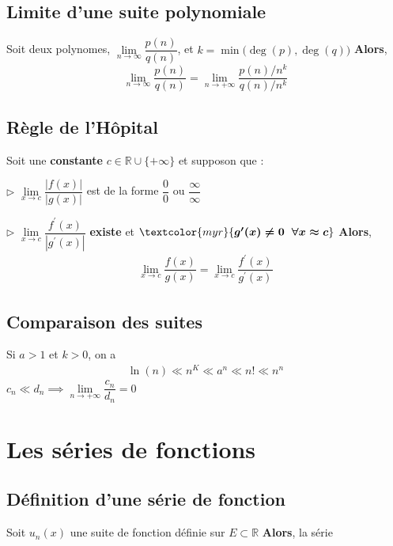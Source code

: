 \documentclass{report}
\begin{document}
\begin{multicols*}{3}
    \section{Limite d'une suite polynomiale} 
        Soit deux polynomes,
        $\lim\limits_{n\to \infty } \dfrac{p(n)}{q(n)}$, 
        et 
        $k = \min\bigl(\deg(p), \deg(q)\bigr)$
        \textbf{Alors},   
        \[ \lim\limits_{n\to \infty } \dfrac{p(n)}{q(n)} =
        \lim\limits_{n\to+\infty}\dfrac{p(n)/{n^k}}{q(n)/n^{k}} \]



    \section{Règle de l'Hôpital}
        Soit une \textbf{constante} $c \in \mathbb{R} \cup \{+\infty\}$ et 
        supposon que : 

        \noindent 
        $\rhd $ $\lim\limits_{x\to c}\dfrac{|f(x)|}{|g(x)|}$ 
            est de la forme $\dfrac{0}{0}$ \; ou \; 
            $\dfrac{\infty }{\infty }$
        

        \noindent
        $\rhd$ $\lim\limits_{x\to c}\dfrac{f^{\prime}(x)}{|g^{\prime}(x)|}$
            \textbf{existe} et 
            $\textcolor{myr}{\boldsymbol{g^{\prime}(x) \neq 0 \;\; \forall x \approx c}}$
        \textbf{Alors}, 
        \begin{align*}
            \boxed{ 
            \lim\limits_{x\to c}\dfrac{f(x)}{g(x)} = 
            \lim\limits_{x\to c}\dfrac{f^{\prime}(x)}{g^{\prime}(x)}
            }
        \end{align*}

                        

    \section{Comparaison des suites}
        Si $a > 1$ et $k > 0$, on a 
        \begin{align*}
            \ln(n) \ll n^K \ll a^n \ll n! \ll n^n
        \end{align*}
        $c_n \ll d_n \implies 
        \lim\limits_{n\to+\infty }\dfrac{c_n}{d_n} = 0$ 



    \chapter{Les séries de fonctions}

    \section{Définition d'une série de fonction}
        Soit $u_n(x)$ une suite de fonction définie sur $E \subset \mathbb{R}$ 
        \textbf{Alors}, la série  
    


\end{multicols*}
\end{document}
